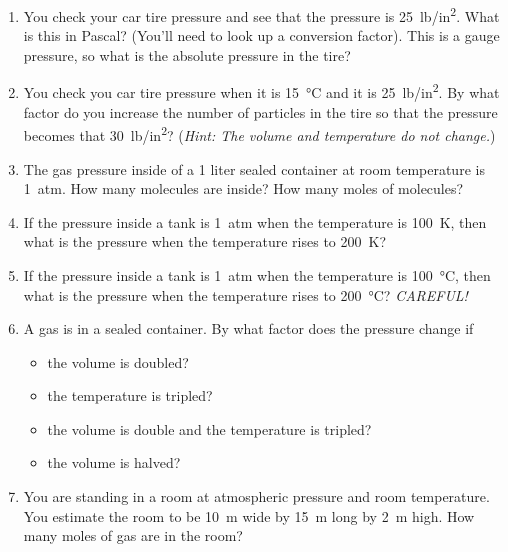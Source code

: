 \begin{enumerate}
\item 
You check your car tire pressure and see that the pressure is \SI{25}{lb/in^2}. What is this in Pascal? (You'll need to look up a conversion factor). This is a gauge pressure, so what is the absolute pressure in the tire?

\item 
You check you car tire pressure when it is \SI{15}{\celsius} and it is \SI{25}{lb/in^2}. By what factor do you increase the number of particles in the tire so that the pressure becomes that \SI{30}{lb/in^2}? (\emph{Hint: The volume and temperature do not change.})

\item
The gas pressure inside of a 1 liter sealed container at room temperature is \SI{1}{atm}. How many molecules are inside? How many moles of molecules?

\item
If the pressure inside a tank is \SI{1}{atm} when the temperature is \SI{100}{\kelvin}, then what is the pressure when the temperature rises to \SI{200}{\kelvin}? 

\item
If the pressure inside a tank is \SI{1}{atm} when the temperature is \SI{100}{\celsius}, then what is the pressure when the temperature rises to \SI{200}{\celsius}? \emph{CAREFUL!}

\item
A gas is in a sealed container. By what factor does the pressure change if 
\begin{itemize}
	\setlength\itemsep{1 in}
	\item the volume is doubled?
	\item the temperature is tripled?
	\item the volume is double and the temperature is tripled?
	\item the volume is halved?
\end{itemize}

\item
You are standing in a room at atmospheric pressure and room temperature. You estimate the room to be \SI{10}{\meter} wide by \SI{15}{\meter} long by \SI{2}{\meter} high. How many moles of gas are in the room?







\end{enumerate}